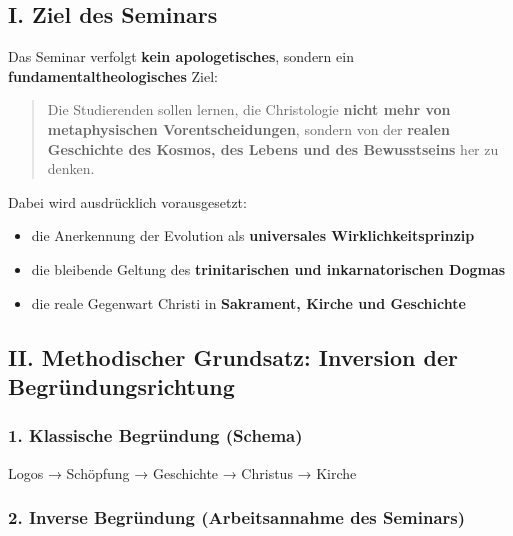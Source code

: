 \documentclass[
]{article}
\begin{document}
\subsection{\texorpdfstring{\textbf{I. Ziel des Seminars}}{I. Ziel des Seminars}}\label{i.-ziel-des-seminars}

Das Seminar verfolgt \textbf{kein apologetisches}, sondern ein \textbf{fundamentaltheologisches} Ziel:

\begin{quote}
Die Studierenden sollen lernen, die Christologie \textbf{nicht mehr von metaphysischen Vorentscheidungen}, sondern von der \textbf{realen Geschichte des Kosmos, des Lebens und des Bewusstseins} her zu denken.
\end{quote}

Dabei wird ausdrücklich vorausgesetzt:

\begin{itemize}
\item
  die Anerkennung der Evolution als \textbf{universales Wirklichkeitsprinzip}
\item
  die bleibende Geltung des \textbf{trinitarischen und inkarnatorischen Dogmas}
\item
  die reale Gegenwart Christi in \textbf{Sakrament, Kirche und Geschichte}
\end{itemize}

\subsection{\texorpdfstring{\textbf{II. Methodischer Grundsatz: Inversion der Begründungsrichtung}}{II. Methodischer Grundsatz: Inversion der Begründungsrichtung}}\label{ii.-methodischer-grundsatz-inversion-der-begruxfcndungsrichtung}

\subsubsection{\texorpdfstring{\textbf{1. Klassische Begründung (Schema)}}{1. Klassische Begründung (Schema)}}\label{klassische-begruxfcndung-schema}

Logos → Schöpfung → Geschichte → Christus → Kirche

\subsubsection{\texorpdfstring{\textbf{2. Inverse Begründung (Arbeitsannahme des Seminars)}}{2. Inverse Begründung (Arbeitsannahme des Seminars)}}\label{inverse-begruxfcndung-arbeitsannahme-des-seminars}
\end{document}
